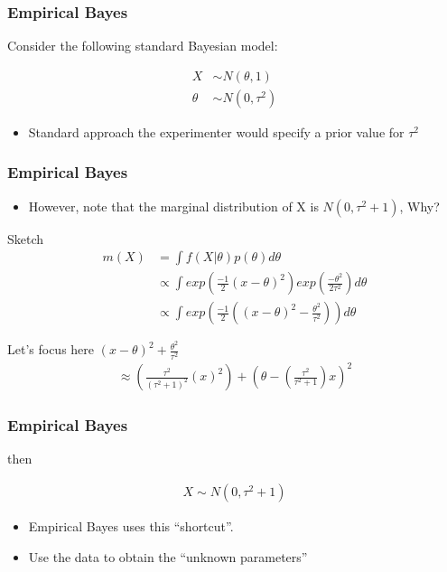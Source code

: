 \documentclass[
  shownotes,
  xcolor={svgnames},
  hyperref={colorlinks,citecolor=DarkBlue,linkcolor=DarkRed,urlcolor=DarkBlue}
  , aspectratio=169]{beamer}
\begin{document}
\begin{frame}[fragile]
\frametitle{Empirical Bayes}

Consider the following standard Bayesian model:

\bigskip

\begin{align}
X &\sim N(\theta,1) \\
\theta &\sim N(0,\tau^2) 
\end{align}

\bigskip
\begin{itemize}
  \item Standard approach the experimenter would specify a prior value for $\tau^2$
\end{itemize}


\end{frame}
\begin{frame}[fragile]
\frametitle{Empirical Bayes}
\begin{itemize}
  \item However, note that the marginal distribution of X is $N(0,\tau^2+1)$, Why?
\end{itemize}
Sketch
\begin{align}
m(X) &=\int f(X|\theta)p(\theta)d\theta \\ \nonumber
 &\propto \int exp \left(\frac{-1}{2}(x-\theta)^2\right) exp \left( \frac{-\theta^2}{2\tau^2}\right) d\theta \\ \nonumber
 &\propto \int exp \left( \frac{-1}{2} \left( (x-\theta)^2 - \frac{\theta^2}{\tau^2}\right)\right) d\theta 
\end{align}

Let's focus here $(x-\theta)^{2}+\frac{\theta^{2}}{\tau^{2}} $
\begin{align}
\approx \left(\frac{\tau^2}{\left(\tau^{2}+1\right)^2}(x)^{2}\right)+\left(\theta-\left(\frac{\tau^{2}}{\tau^{2}+1}\right)x\right)^{2} 
\end{align}

\end{frame}
\begin{frame}[fragile]
\frametitle{Empirical Bayes}


then

\begin{align}
X \sim N(0,\tau^2+1)
\end{align}


\bigskip
\begin{itemize}
  \item Empirical Bayes uses this ``shortcut''.
  \item Use the data to obtain the ``unknown parameters''
\end{itemize}

\end{frame}
\end{document}
